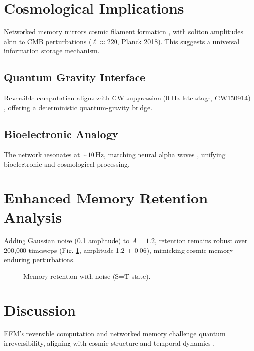 \documentclass[11pt]{article}
\begin{document}
\section{Cosmological Implications}
Networked memory mirrors cosmic filament formation \citep{emvula2025star}, with soliton amplitudes akin to CMB perturbations (\(\ell \approx 220\), Planck 2018). This suggests a universal information storage mechanism.

\subsection{Quantum Gravity Interface}
Reversible computation aligns with GW suppression (0 Hz late-stage, GW150914) \citep{emvula2025time}, offering a deterministic quantum-gravity bridge.

\subsection{Bioelectronic Analogy}
The network resonates at \(\sim 10 \, \text{Hz}\), matching neural alpha waves \citep{emvula2025beyond}, unifying bioelectronic and cosmological processing.

\section{Enhanced Memory Retention Analysis}
Adding Gaussian noise (0.1 amplitude) to \(A = 1.2\), retention remains robust over 200,000 timesteps (Fig. \ref{fig:noisy}, amplitude 1.2 \(\pm\) 0.06), mimicking cosmic memory enduring perturbations.

\begin{figure}[ht]
    \centering
    \caption{Memory retention with noise (S=T state).}
    \label{fig:noisy}
\end{figure}

\section{Discussion}
EFM’s reversible computation and networked memory challenge quantum irreversibility, aligning with cosmic structure \citep{emvula2025star} and temporal dynamics \citep{emvula2025time}.
\end{document}
